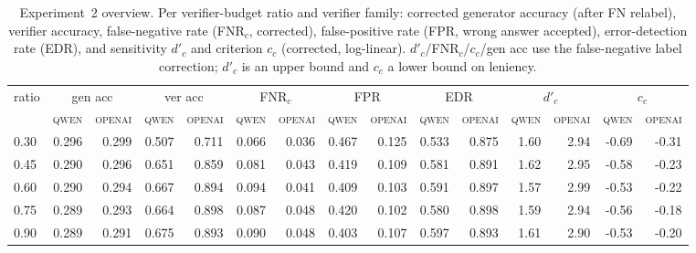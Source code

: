 \begin{table}[t]
\centering
\caption{Experiment~2 overview. Per verifier-budget ratio and verifier family: corrected generator accuracy (after FN relabel), verifier accuracy, false-negative rate (FNR$_c$, corrected), false-positive rate (FPR, wrong answer accepted), error-detection rate (EDR), and sensitivity $d'_c$ and criterion $c_c$ (corrected, log-linear). $d'_c$/FNR$_c$/$c_c$/gen acc use the false-negative label correction; $d'_c$ is an upper bound and $c_c$ a lower bound on leniency.}
\label{tab:overview}
\footnotesize
\begin{tabular}{l*{14}{r}}
\toprule
ratio & \multicolumn{2}{c}{gen acc} & \multicolumn{2}{c}{ver acc} & \multicolumn{2}{c}{FNR$_c$} & \multicolumn{2}{c}{FPR} & \multicolumn{2}{c}{EDR} & \multicolumn{2}{c}{$d'_c$} & \multicolumn{2}{c}{$c_c$} \\
\cmidrule(lr){2-3} \cmidrule(lr){4-5} \cmidrule(lr){6-7} \cmidrule(lr){8-9} \cmidrule(lr){10-11} \cmidrule(lr){12-13} \cmidrule(lr){14-15}
 & \textsc{qwen} & \textsc{openai} & \textsc{qwen} & \textsc{openai} & \textsc{qwen} & \textsc{openai} & \textsc{qwen} & \textsc{openai} & \textsc{qwen} & \textsc{openai} & \textsc{qwen} & \textsc{openai} & \textsc{qwen} & \textsc{openai} \\
\midrule
0.30 & 0.296 & 0.299 & 0.507 & 0.711 & 0.066 & 0.036 & 0.467 & 0.125 & 0.533 & 0.875 & 1.60 & 2.94 & -0.69 & -0.31 \\
0.45 & 0.290 & 0.296 & 0.651 & 0.859 & 0.081 & 0.043 & 0.419 & 0.109 & 0.581 & 0.891 & 1.62 & 2.95 & -0.58 & -0.23 \\
0.60 & 0.290 & 0.294 & 0.667 & 0.894 & 0.094 & 0.041 & 0.409 & 0.103 & 0.591 & 0.897 & 1.57 & 2.99 & -0.53 & -0.22 \\
0.75 & 0.289 & 0.293 & 0.664 & 0.898 & 0.087 & 0.048 & 0.420 & 0.102 & 0.580 & 0.898 & 1.59 & 2.94 & -0.56 & -0.18 \\
0.90 & 0.289 & 0.291 & 0.675 & 0.893 & 0.090 & 0.048 & 0.403 & 0.107 & 0.597 & 0.893 & 1.61 & 2.90 & -0.53 & -0.20 \\
\bottomrule
\end{tabular}
\end{table}
